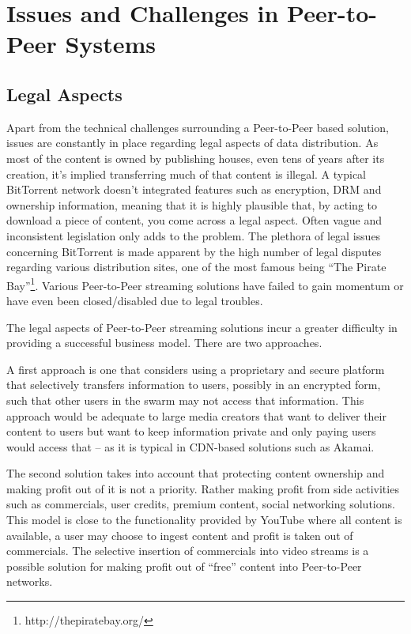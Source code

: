 \section{Issues and Challenges in Peer-to-Peer Systems}
\label{sec:p2p-systems:issues}

\subsection{Legal Aspects}
\label{subsec:p2p-streaming-legal}

Apart from the technical challenges surrounding a Peer-to-Peer based solution,
issues are constantly in place regarding legal aspects of data distribution.
As most of the content is owned by publishing houses, even tens of years after
its creation, it's implied transferring much of that content is illegal. A
typical BitTorrent network doesn't integrated features such as encryption, DRM
and ownership information, meaning that it is highly plausible that, by acting
to download a piece of content, you come across a legal aspect. Often vague
and inconsistent legislation only adds to the problem. The plethora of legal
issues concerning BitTorrent is made apparent by the high number of legal
disputes regarding various distribution sites, one of the most famous being
``The Pirate Bay''\footnote{http://thepiratebay.org/}. Various Peer-to-Peer
streaming solutions have failed to gain momentum or have even been
closed/disabled due to legal troubles.

The legal aspects of Peer-to-Peer streaming solutions incur a greater
difficulty in providing a successful business model. There are two approaches.

A first approach is one that considers using a proprietary and secure platform
that selectively transfers information to users, possibly in an encrypted
form, such that other users in the swarm may not access that information. This
approach would be adequate to large media creators that want to deliver their
content to users but want to keep information private and only paying users
would access that -- as it is typical in CDN-based solutions such as Akamai.

The second solution takes into account that protecting content ownership and
making profit out of it is not a priority. Rather making profit from side
activities such as commercials, user credits, premium content, social
networking solutions. This model is close to the functionality provided by
YouTube where all content is available, a user may choose to ingest content
and profit is taken out of commercials. The selective insertion of commercials
into video streams is a possible solution for making profit out of ``free''
content into Peer-to-Peer networks.

